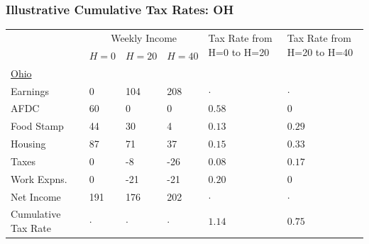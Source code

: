 \documentclass{beamer}
\begin{document}
\begin{frame}
\frametitle[alignment=center]{Illustrative Cumulative Tax Rates: OH}
\begin{table}
\centering
\begin{tabular}{p{2cm}p{1.3cm}p{1.3cm}p{1.3cm}p{1.5cm}p{1.5cm}}
 &  \multicolumn{3}{c}{Weekly Income} & \multirow{3}{*}{\parbox{1.5cm}{Tax Rate from H=0 to H=20}} & \multirow{3}{*}{\parbox{1.5cm}{Tax Rate from H=20 to H=40}} \\
 \cline{2-4}
  &  \multirow{3}{*}{$H=0$} & \multirow{3}{*}{$H=20$} & \multirow{3}{*}{$H=40$} & &  \\
  & & & & \\
    & & & & \\
\hline
\underline{Ohio} &  &  &  &  &  \\
Earnings & 0 & 104 & 208 & $\cdot$ & $\cdot$\\ 
AFDC & 60 & 0 & 0 & $0.58$ & $0$\\ 
Food Stamp & 44 & 30 & 4 & $0.13$ & $0.29$\\ 
Housing  & 87 & 71 & 37 & $0.15$ & $0.33$\\ 
Taxes & 0 & -8 & -26 & $0.08$ & $0.17$\\ 
Work Expns. & 0 & -21 & -21 & $0.20$ & $0$\\ 
Net Income & 191 & 176 & 202 & $\cdot$ & $\cdot$\\ 
\multirow{2}{*}{\parbox{2cm}{Cumulative Tax Rate}} & \multirow{2}{*}{$\cdot$} & \multirow{2}{*}{$\cdot$} & \multirow{2}{*}{$\cdot$} & \multirow{2}{*}{$1.14$} & \multirow{2}{*}{$0.75$}\\
\end{tabular}
\end{table}
\end{frame}
\end{document}
